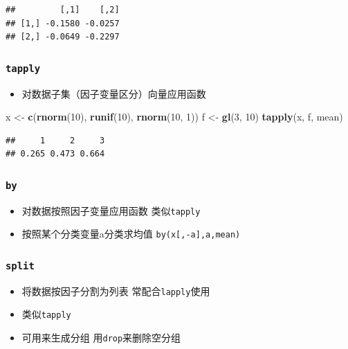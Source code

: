 \documentclass[]{book}
\newenvironment{Shaded}{\begin{snugshade}}{\end{snugshade}}
\newcommand{\DecValTok}[1]{\textcolor[rgb]{0.00,0.00,0.81}{#1}}
\newcommand{\KeywordTok}[1]{\textcolor[rgb]{0.13,0.29,0.53}{\textbf{#1}}}
\newcommand{\NormalTok}[1]{#1}
\newcommand{\StringTok}[1]{\textcolor[rgb]{0.31,0.60,0.02}{#1}}
\providecommand{\tightlist}{%
  \setlength{\itemsep}{0pt}\setlength{\parskip}{0pt}}
\begin{document}
\begin{verbatim}
##         [,1]    [,2]
## [1,] -0.1580 -0.0257
## [2,] -0.0649 -0.2297
\end{verbatim}

\hypertarget{tapply}{%
\subsubsection{\texorpdfstring{\texttt{tapply}}{tapply}}\label{tapply}}

\begin{itemize}
\tightlist
\item
  对数据子集（因子变量区分）向量应用函数
\end{itemize}

\begin{Shaded}
\begin{Highlighting}[]
\NormalTok{x <-}\StringTok{ }\KeywordTok{c}\NormalTok{(}\KeywordTok{rnorm}\NormalTok{(}\DecValTok{10}\NormalTok{), }\KeywordTok{runif}\NormalTok{(}\DecValTok{10}\NormalTok{), }\KeywordTok{rnorm}\NormalTok{(}\DecValTok{10}\NormalTok{, }\DecValTok{1}\NormalTok{))}
\NormalTok{f <-}\StringTok{ }\KeywordTok{gl}\NormalTok{(}\DecValTok{3}\NormalTok{, }\DecValTok{10}\NormalTok{)}
\KeywordTok{tapply}\NormalTok{(x, f, mean)}
\end{Highlighting}
\end{Shaded}

\begin{verbatim}
##     1     2     3 
## 0.265 0.473 0.664
\end{verbatim}

\hypertarget{by}{%
\subsubsection{\texorpdfstring{\texttt{by}}{by}}\label{by}}

\begin{itemize}
\tightlist
\item
  对数据按照因子变量应用函数 类似\texttt{tapply}
\item
  按照某个分类变量a分类求均值 \texttt{by(x{[},-a{]},a,mean)}
\end{itemize}

\hypertarget{split}{%
\subsubsection{\texorpdfstring{\texttt{split}}{split}}\label{split}}

\begin{itemize}
\tightlist
\item
  将数据按因子分割为列表 常配合\texttt{lapply}使用
\item
  类似\texttt{tapply}
\item
  可用来生成分组 用\texttt{drop}来删除空分组
\end{itemize}
\end{document}

